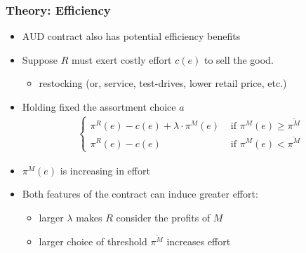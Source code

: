 
\begin{frame}
\frametitle{Theory: Efficiency}
\begin{itemize}
\item AUD contract also has potential efficiency benefits
\item Suppose $R$ must exert costly effort $c(e)$ to sell the good.
\begin{itemize}
\item restocking (or, service, test-drives, lower retail price, etc.)
\end{itemize}
\item Holding fixed the assortment choice $a$
\begin{eqnarray*}
\label{effortchoice}
\begin{cases}
 \pi^R(e) -c(e) + \lambda \cdot \pi^M(e) &\mbox{ if } \pi^M(e) \geq \overline{\pi^M}\\
 \pi^R(e)  -c(e)   &\mbox{ if } \pi^M(e) < \overline{\pi^M}
\end{cases}
\end{eqnarray*}
\item $\pi^M(e)$ is increasing in effort
\item Both features of the contract can induce greater effort: 
\begin{itemize}
\item larger $\lambda$ makes $R$ consider the profits of $M$
\item larger choice of threshold $\overline{\pi^M}$ increases effort
\end{itemize}
\end{itemize}
\end{frame}


